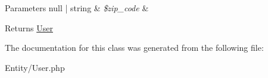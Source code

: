 \begin{DoxyParams}[1]{Parameters}
null | string & {\em \$zip\+\_\+code} & \\
\hline
\end{DoxyParams}
\begin{DoxyReturn}{Returns}
\mbox{\hyperlink{class_app_1_1_entity_1_1_user}{User}} 
\end{DoxyReturn}


The documentation for this class was generated from the following file\+:\begin{DoxyCompactItemize}
\item 
Entity/User.\+php\end{DoxyCompactItemize}
